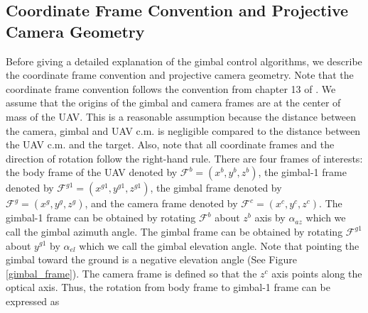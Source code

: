 \subsection{Coordinate Frame Convention and Projective Camera Geometry}
Before giving a detailed explanation of the gimbal control algorithms, we describe the coordinate frame convention and projective camera geometry. Note that the coordinate frame convention follows the convention from chapter 13 of \cite{beard2012small}. We assume that the origins of the gimbal and camera frames are at the center of mass of the UAV. This is a reasonable assumption because the distance between the camera, gimbal and UAV c.m. is negligible compared to the distance between the UAV c.m. and the target. Also, note that all coordinate frames and the direction of rotation follow the right-hand rule. There are four frames of interests: the body frame of the UAV denoted by $\mathcal{F}^b=(x^{b}, y^{b}, z^{b})$, the gimbal-1 frame denoted by $\mathcal{F}^{g1}=(x^{g1}, y^{g1}, z^{g1})$, the gimbal frame denoted by $\mathcal{F}^{g}=(x^{g}, y^{g}, z^{g})$, and the camera frame denoted by $\mathcal{F}^{c}=(x^{c}, y^{c}, z^{c})$. The gimbal-1 frame can be obtained by rotating $\mathcal{F}^b$ about $z^{b}$ axis by $\alpha_{az}$ which we call the gimbal azimuth angle. The gimbal frame can be obtained by rotating $\mathcal{F}^{g1}$ about $y^{g1}$ by $\alpha_{el}$ which we call the gimbal elevation angle. Note that pointing the gimbal toward the ground is a negative elevation angle (See Figure \ref{gimbal_frame}). The camera frame is defined so that the $z^{c}$ axis points along the optical axis. Thus, the rotation from body frame to gimbal-1 frame can be expressed as

